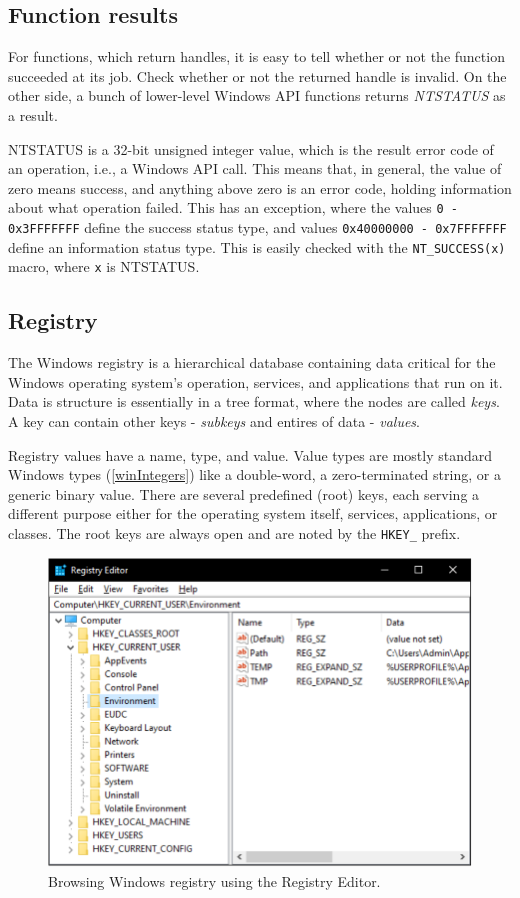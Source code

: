 \subsection{Function results}
For functions, which return handles, it is easy to tell whether or not the function succeeded at its job. Check whether or not the returned handle is invalid. On the other side, a bunch of lower-level Windows API functions returns \textit{NTSTATUS} as a result.

NTSTATUS is a 32-bit unsigned integer value, which is the result error code of an operation, i.e., a Windows API call. This means that, in general, the value of zero means success, and anything above zero is an error code, holding information about what operation failed. This has an exception, where the values \lstinline{0 - 0x3FFFFFFF} define the success status type, and values 
\lstinline{0x40000000 - 0x7FFFFFFF} define an information status type. This is easily checked with the \lstinline{NT_SUCCESS(x)} macro, where \lstinline{x} is NTSTATUS.\cite{WinNTSTATUS}\cite{WinNTSuccess}

\subsection{Registry}
The Windows registry is a hierarchical database containing data critical for the Windows operating system's operation, services, and applications that run on it. Data is structure is essentially in a tree format, where the nodes are called \textit{keys}. A key can contain other keys - \textit{subkeys} and entires of data - \textit{values}. 

Registry values have a name, type, and value. Value types are mostly standard Windows types (\ref{winIntegers}) like a double-word, a zero-terminated string, or a generic binary value. There are several predefined (root) keys, each serving a different purpose either for the operating system itself, services, applications, or classes. The root keys are always open and are noted by the \lstinline{HKEY_} prefix.

\begin{figure}[htb!]
	\centering
	\includegraphics[]{obrazky-figures/regedit.pdf}
	\caption{Browsing Windows registry using the Registry Editor.}
	\label{winRegedit}
\end{figure}

